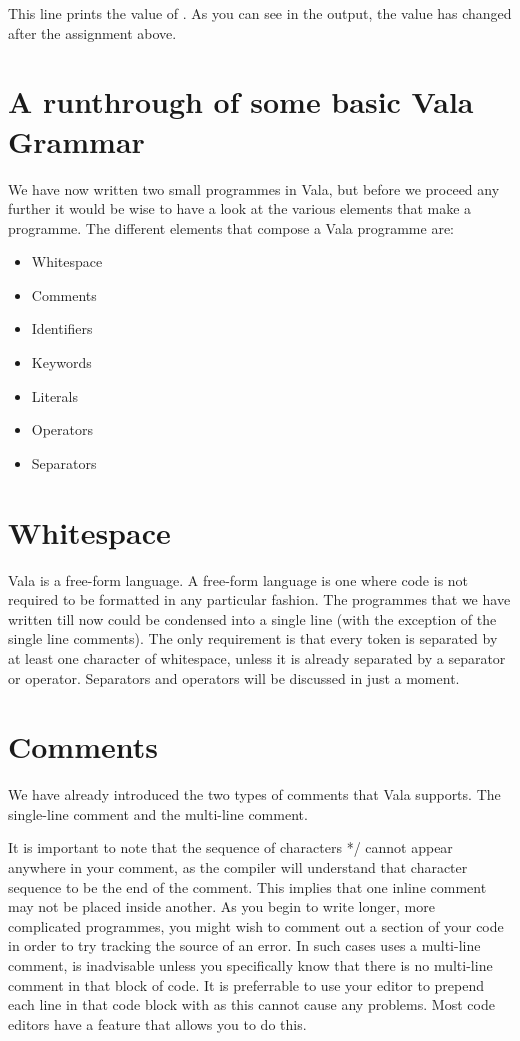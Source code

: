 
This line prints the value of . As you can see in the output, the value has changed after the assignment above.

\section{A runthrough of some basic Vala Grammar}
We have now written two small programmes in Vala, but before we proceed any further it would be wise to have a look at the various elements that make a programme. The different elements that compose a Vala programme are:

\begin{itemize}
\item Whitespace
\item Comments
\item Identifiers
\item Keywords
\item Literals
\item Operators
\item Separators
\end{itemize}

\section{Whitespace}
Vala is a free-form language. A free-form language is one where code is not required to be formatted in any particular fashion. The programmes that we have written till now could be condensed into a single line (with the exception of the single line comments). The only requirement is that every token is separated by at least one character of whitespace, unless it is already separated by a separator or operator. Separators and operators will be discussed in just a moment.

\section{Comments}
We have already introduced the two types of comments that Vala supports. The single-line comment and the multi-line comment.

It is important to note that the sequence of characters */ cannot appear anywhere in your comment, as the compiler will understand that character sequence to be the end of the comment. This implies that one inline comment may not be placed inside another. As you begin to write longer, more complicated programmes, you might wish to comment out a section of your code in order to try tracking the source of an error. In such cases uses a multi-line comment, is inadvisable unless you specifically know that there is no multi-line comment in that block of code. It is preferrable to use your editor to prepend each line in that code block with \inlinecode{//} as this cannot cause any problems. Most code editors have a feature that allows you to do this.

